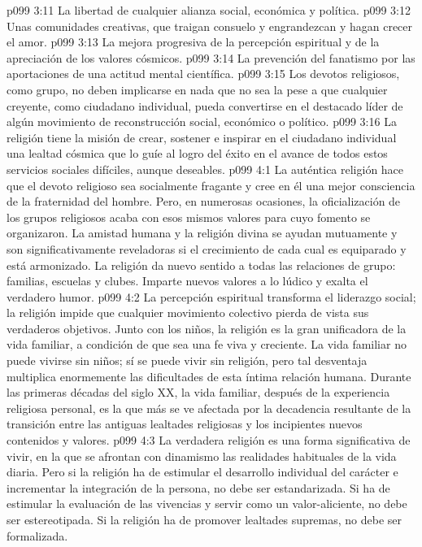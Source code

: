 \vs p099 3:11 La libertad de cualquier alianza social, económica y política.
\vs p099 3:12 Unas comunidades creativas, que traigan consuelo y engrandezcan y hagan crecer el amor.
\vs p099 3:13 La mejora progresiva de la percepción espiritual y de la apreciación de los valores cósmicos.
\vs p099 3:14 La prevención del fanatismo por las aportaciones de una actitud mental científica.
\vs p099 3:15 \pc Los devotos religiosos, como grupo, no deben implicarse en nada que no sea la  pese a que cualquier creyente, como ciudadano individual, pueda convertirse en el destacado líder de algún movimiento de reconstrucción social, económico o político.
\vs p099 3:16 La religión tiene la misión de crear, sostener e inspirar en el ciudadano individual una lealtad cósmica que lo guíe al logro del éxito en el avance de todos estos servicios sociales difíciles, aunque deseables.
\vs p099 4:1 La auténtica religión hace que el devoto religioso sea socialmente fragante y cree en él una mejor consciencia de la fraternidad del hombre. Pero, en numerosas ocasiones, la oficialización de los grupos religiosos acaba con esos mismos valores para cuyo fomento se organizaron. La amistad humana y la religión divina se ayudan mutuamente y son significativamente reveladoras si el crecimiento de cada cual es equiparado y está armonizado. La religión da nuevo sentido a todas las relaciones de grupo: familias, escuelas y clubes. Imparte nuevos valores a lo lúdico y exalta el verdadero humor.
\vs p099 4:2 La percepción espiritual transforma el liderazgo social; la religión impide que cualquier movimiento colectivo pierda de vista sus verdaderos objetivos. Junto con los niños, la religión es la gran unificadora de la vida familiar, a condición de que sea una fe viva y creciente. La vida familiar no puede vivirse sin niños; sí se puede vivir sin religión, pero tal desventaja multiplica enormemente las dificultades de esta íntima relación humana. Durante las primeras décadas del siglo XX, la vida familiar, después de la experiencia religiosa personal, es la que más se ve afectada por la decadencia resultante de la transición entre las antiguas lealtades religiosas y los incipientes nuevos contenidos y valores.
\vs p099 4:3 \pc La verdadera religión es una forma significativa de vivir, en la que se afrontan con dinamismo las realidades habituales de la vida diaria. Pero si la religión ha de estimular el desarrollo individual del carácter e incrementar la integración de la persona, no debe ser estandarizada. Si ha de estimular la evaluación de las vivencias y servir como un valor\hyp{}aliciente, no debe ser estereotipada. Si la religión ha de promover lealtades supremas, no debe ser formalizada.
